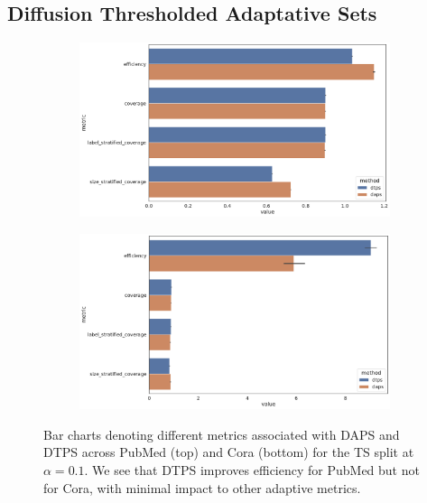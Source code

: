\subsection{Diffusion Thresholded Adaptative Sets}
\begin{figure}
    \centering
    \begin{subfigure}{0.7\linewidth}
        \includegraphics[width=\linewidth,alt={Bar charts denoting different metrics associated with DAPS and DTPS across PubMed }]{graphConformal/figures/split/daps_dtps_pubmed}
    \end{subfigure}
    \begin{subfigure}{0.7\linewidth}
        \includegraphics[width=\linewidth,alt={ar charts denoting different metrics associated with DAPS and DTPS across Cora.}]{graphConformal/figures/split/daps_dtps_cora}
    \end{subfigure}
    \caption{Bar charts denoting different metrics associated with DAPS and DTPS across PubMed (top) and Cora (bottom) for the TS split at $\alpha=0.1$. We see that DTPS improves efficiency for PubMed but not for Cora, with minimal impact to other adaptive metrics.}
    \label{fig:fs:conformal:daps_vs_dtps}
\end{figure}


